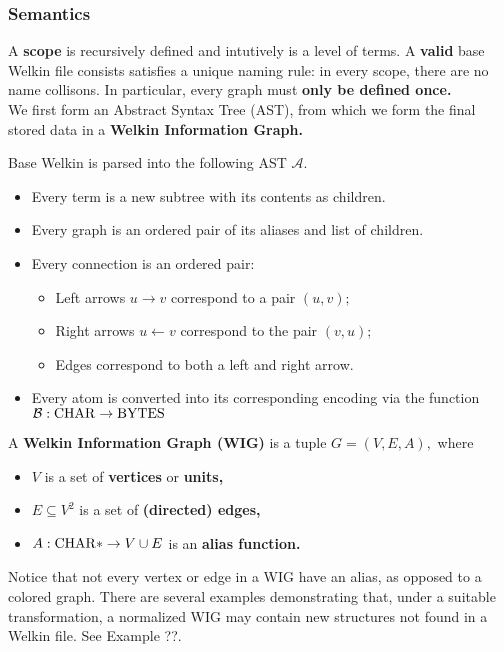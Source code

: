 \subsubsection*{Semantics}
A \textbf{scope} is recursively defined and intutively is a level of terms. A \textbf{valid} base Welkin file consists satisfies a unique naming rule: in every scope, there are no name collisons. In particular, every graph must \textbf{only be defined once.}
\\ We first form an Abstract Syntax Tree (AST), from which we form the final stored data in a \textbf{Welkin Information Graph.}
\begin{definition}
  Base Welkin is parsed into the following AST $\mathcal{A}.$
  \begin{itemize}
	\item Every term is a new subtree with its contents as children.
    \item Every graph is an ordered pair of its aliases and list of children.
    \item Every connection is an ordered pair:
		  \begin{itemize}
			\item Left arrows $u \to v$ correspond to a pair $(u,v);$
			\item Right arrows $u \leftarrow v$ correspond to the pair $(v, u);$
			\item Edges correspond to both a left and right arrow.
		  \end{itemize}
	\item Every atom is converted into its corresponding encoding via the function $\mathcal{B} : \mathrm{CHAR} \to \mathrm{BYTES}$
\end{itemize}
 \end{definition}
\begin{definition}
	A \textbf{Welkin Information Graph (WIG)} is a tuple $G = (V, E, A),$ where
	\begin{itemize}
		\item $V$ is a set of \textbf{vertices} or \textbf{units,}
		\item $E \subseteq V^{2} $ is a set of \textbf{(directed) edges,}
		\item $A: \mathrm{CHAR}* \to V \cup E$ is an \textbf{alias function.}
	\end{itemize}
  \end{definition}
  Notice that not every vertex or edge in a WIG have an alias, as opposed to a colored graph. There are several examples demonstrating that, under a suitable transformation, a normalized WIG may contain new structures not found in a Welkin file. See Example ??.
